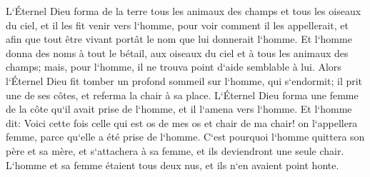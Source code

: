 \verse L`Éternel Dieu forma de la terre tous les animaux des champs et tous les oiseaux du ciel, et il les fit venir vers l`homme, pour voir comment il les appellerait, et afin que tout être vivant portât le nom que lui donnerait l`homme. 
\verse Et l`homme donna des noms à tout le bétail, aux oiseaux du ciel et à tous les animaux des champs; mais, pour l`homme, il ne trouva point d`aide semblable à lui. 
\verse Alors l`Éternel Dieu fit tomber un profond sommeil sur l`homme, qui s`endormit; il prit une de ses côtes, et referma la chair à sa place. 
\verse L`Éternel Dieu forma une femme de la côte qu`il avait prise de l`homme, et il l`amena vers l`homme. 
\verse Et l`homme dit: Voici cette fois celle qui est os de mes os et chair de ma chair! on l`appellera femme, parce qu`elle a été prise de l`homme. 
\verse C`est pourquoi l`homme quittera son père et sa mère, et s`attachera à sa femme, et ils deviendront une seule chair. 
\verse L`homme et sa femme étaient tous deux nus, et ils n`en avaient point honte. 

\chapter{}

